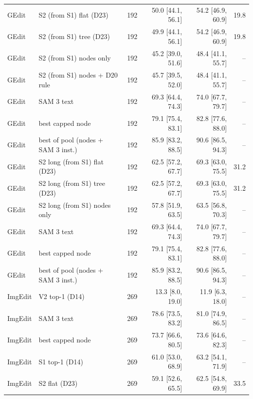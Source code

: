 \begin{tabular}{llrrrr}
\midrule
GEdit & S2 (from S1) flat (D23) & 192 & 50.0 \scriptsize{[44.1, 56.1]} & 54.2 \scriptsize{[46.9, 60.9]} & 19.8 \\
GEdit & S2 (from S1) tree (D23) & 192 & 49.9 \scriptsize{[44.1, 56.1]} & 54.2 \scriptsize{[46.9, 60.9]} & 19.8 \\
GEdit & S2 (from S1) nodes only & 192 & 45.2 \scriptsize{[39.0, 51.6]} & 48.4 \scriptsize{[41.1, 55.7]} & -- \\
GEdit & S2 (from S1) nodes + D20 rule & 192 & 45.7 \scriptsize{[39.5, 52.0]} & 48.4 \scriptsize{[41.1, 55.7]} & -- \\
GEdit & SAM 3 text & 192 & 69.3 \scriptsize{[64.4, 74.3]} & 74.0 \scriptsize{[67.7, 79.7]} & -- \\
GEdit & best capped node & 192 & 79.1 \scriptsize{[75.4, 83.1]} & 82.8 \scriptsize{[77.6, 88.0]} & -- \\
GEdit & best of pool (nodes + SAM 3 inst.) & 192 & 85.9 \scriptsize{[83.2, 88.5]} & 90.6 \scriptsize{[86.5, 94.3]} & -- \\
\midrule
GEdit & S2 long (from S1) flat (D23) & 192 & 62.5 \scriptsize{[57.2, 67.7]} & 69.3 \scriptsize{[63.0, 75.5]} & 31.2 \\
GEdit & S2 long (from S1) tree (D23) & 192 & 62.5 \scriptsize{[57.2, 67.7]} & 69.3 \scriptsize{[63.0, 75.5]} & 31.2 \\
GEdit & S2 long (from S1) nodes only & 192 & 57.8 \scriptsize{[51.9, 63.5]} & 63.5 \scriptsize{[56.8, 70.3]} & -- \\
GEdit & SAM 3 text & 192 & 69.3 \scriptsize{[64.4, 74.3]} & 74.0 \scriptsize{[67.7, 79.7]} & -- \\
GEdit & best capped node & 192 & 79.1 \scriptsize{[75.4, 83.1]} & 82.8 \scriptsize{[77.6, 88.0]} & -- \\
GEdit & best of pool (nodes + SAM 3 inst.) & 192 & 85.9 \scriptsize{[83.2, 88.5]} & 90.6 \scriptsize{[86.5, 94.3]} & -- \\
\midrule
ImgEdit & V2 top-1 (D14) & 269 & 13.3 \scriptsize{[8.0, 19.0]} & 11.9 \scriptsize{[6.3, 18.0]} & -- \\
ImgEdit & SAM 3 text & 269 & 78.6 \scriptsize{[73.5, 83.2]} & 81.0 \scriptsize{[74.9, 86.5]} & -- \\
ImgEdit & best capped node & 269 & 73.7 \scriptsize{[66.6, 80.5]} & 73.6 \scriptsize{[64.6, 82.3]} & -- \\
ImgEdit & S1 top-1 (D14) & 269 & 61.0 \scriptsize{[53.0, 68.9]} & 63.2 \scriptsize{[54.1, 71.9]} & -- \\
\midrule
ImgEdit & S2 flat (D23) & 269 & 59.1 \scriptsize{[52.6, 65.5]} & 62.5 \scriptsize{[54.8, 69.9]} & 33.5 \\

\end{tabular}
